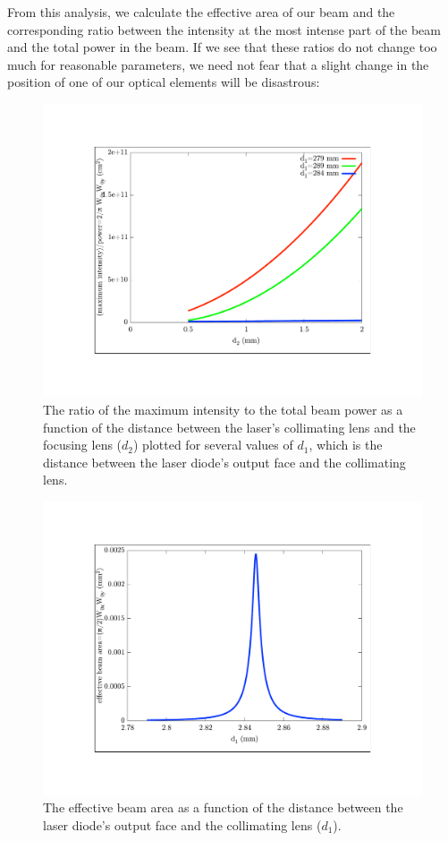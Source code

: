 From this analysis, we calculate the effective area of our beam and the corresponding ratio between the intensity at the most intense part of the beam and the total power in the beam. If we see that these ratios do not change too much for reasonable parameters, we need not fear that a slight change in the position of one of our optical elements will be disastrous:

\begin{figure}
    \centerline{\includegraphics{waists1}}
    \caption[]{\label{waists1} The ratio of the maximum intensity to the total beam power as a function of the distance between the laser's collimating lens and the focusing lens ($d_2$) plotted for several values of $d_1$, which is the distance between the laser diode's output face and the collimating lens.}
\end{figure}

\begin{figure}
    \centerline{\includegraphics{waists2}}
    \caption[]{\label{waists2}
        The effective beam area as a function of the distance between the laser diode's output face and the collimating lens ($d_1$).}
\end{figure}
